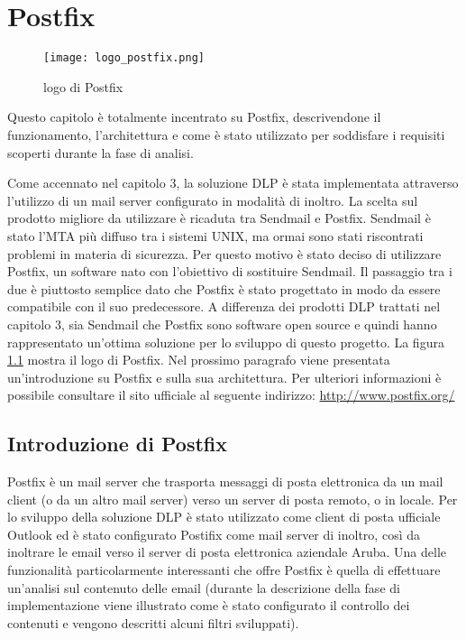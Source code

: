 \chapter{Postfix}

\begin{figure}[htp]
    \centering
    \texttt{[image: logo\_postfix.png]}
        \caption{logo di Postfix}\label{logoPostfix}
  \end{figure}

  Questo capitolo è totalmente incentrato su Postfix, descrivendone il funzionamento, 
  l'architettura e come è stato utilizzato per soddisfare i requisiti scoperti durante la fase di analisi.
  
  Come accennato nel capitolo 3, la soluzione DLP è stata implementata attraverso l'utilizzo di un 
  mail server configurato in modalità di inoltro.
  La scelta sul prodotto migliore da utilizzare è ricaduta tra Sendmail e Postfix. 
  Sendmail è stato l'MTA più diffuso tra i sistemi UNIX, ma ormai sono stati riscontrati problemi in materia
  di sicurezza. 
  Per questo motivo è stato deciso di utilizzare Postfix, un software nato con l'obiettivo di sostituire Sendmail. Il passaggio
  tra i due è piuttosto semplice dato che Postfix è stato progettato in modo da essere compatibile con il 
  suo predecessore.
  A differenza dei prodotti DLP trattati nel capitolo 3, sia Sendmail che Postfix sono software open source e
  quindi hanno rappresentato un'ottima soluzione per lo sviluppo di questo progetto.
  La figura \ref{logoPostfix} mostra il logo di Postfix.
  Nel prossimo paragrafo viene presentata un'introduzione su Postfix e sulla sua architettura. Per ulteriori
  informazioni è possibile consultare il sito ufficiale al seguente indirizzo: \url{http://www.postfix.org/}
   
  \pagebreak
  \section{Introduzione di Postfix}
  Postfix è un mail server che trasporta messaggi di posta elettronica da un mail client 
  (o da un altro mail server) verso un server di posta remoto, o in locale. 
  Per lo sviluppo della soluzione DLP è stato utilizzato come client di posta ufficiale Outlook 
  ed è stato configurato Postifix come mail server di inoltro, 
  così da inoltrare le email verso il server di posta elettronica aziendale Aruba. 
  Una delle funzionalità particolarmente interessanti che offre Postfix è quella di effettuare 
  un’analisi sul contenuto delle email (durante la descrizione della fase di implementazione viene illustrato 
  come è stato configurato il controllo dei contenuti e vengono descritti alcuni filtri sviluppati).
  
